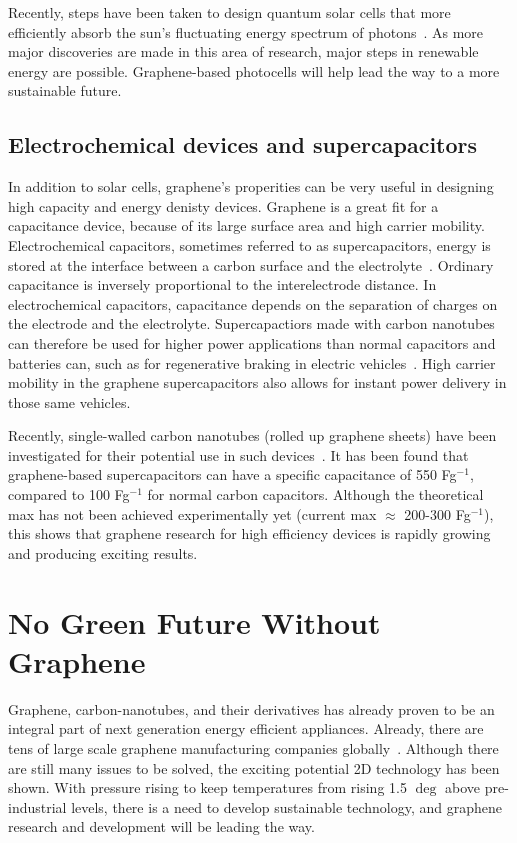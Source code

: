 \documentclass[10pt]{article}
\begin{document}
Recently, steps have been taken to design quantum solar cells that more efficiently absorb the sun's fluctuating energy spectrum of photons~\cite{Arp2016}. As more major discoveries are made in this area of research, major steps in renewable energy are possible. Graphene-based photocells will help lead the way to a more sustainable future.


\subsection*{Electrochemical devices and supercapacitors}
In addition to solar cells, graphene's properities can be very useful in designing high capacity and energy denisty devices. Graphene is a great fit for a capacitance device, because of its large surface area and high carrier mobility. Electrochemical capacitors, sometimes referred to as supercapacitors, energy is stored at the interface between a carbon surface and the electrolyte~\cite{Niu1997}. Ordinary capacitance is inversely proportional to the interelectrode distance. In electrochemical capacitors, capacitance depends on the separation of charges on the electrode and the electrolyte.
Supercapactiors made with carbon nanotubes can therefore be used for higher power applications than normal capacitors and batteries can, such as for regenerative braking in electric vehicles~\cite{Baughman2002}. High carrier mobility in the graphene supercapacitors also allows for instant power delivery in those same vehicles.

Recently, single-walled carbon nanotubes (rolled up graphene sheets) have been investigated for their potential use in such devices~\cite{Liu2014}. It has been found that graphene-based supercapacitors can have a specific capacitance of 550 Fg$^{-1}$, compared to 100 Fg$^{-1}$ for normal carbon capacitors. Although the theoretical max has not been achieved experimentally yet (current max $\approx$ 200-300 Fg$^{-1}$), this shows that graphene research for high efficiency devices is rapidly growing and producing exciting results.

\section*{No Green Future Without Graphene}

Graphene, carbon-nanotubes, and their derivatives has already proven to be an integral part of next generation energy efficient appliances. Already, there are tens of large scale graphene manufacturing companies globally~\cite{Ren2014}. Although there are still many issues to be solved, the exciting potential 2D technology has been shown. With pressure rising to keep temperatures from rising 1.5 $\deg$ above pre-industrial levels, there is a need to develop sustainable technology, and graphene research and development will be leading the way.
\newpage


\end{document}
